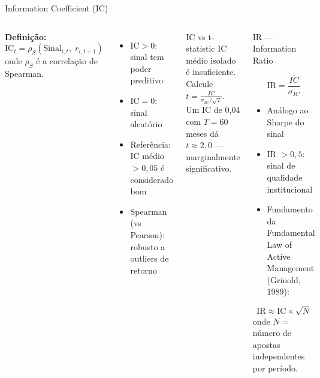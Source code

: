 \documentclass[aspectratio=169,12pt]{beamer}
\begin{document}
\begin{frame}[fragile]{Information Coefficient (IC)}
\begin{columns}[T]
\textbf{Definição:}
\[ \text{IC}_t = \rho_S\!\left(\text{Sinal}_{i,t},\; r_{i,t+1}\right) \]
onde $\rho_S$ é a correlação de Spearman.
\vspace{.4em}
\begin{itemize}
  \item $\text{IC} > 0$: sinal tem poder preditivo
  \item $\text{IC} = 0$: sinal aleatório
  \item Referência: IC médio $> 0{,}05$ é considerado bom
  \item Spearman (vs Pearson): robusto a outliers de retorno
\end{itemize}
\vspace{.3em}
\begin{alertblock}{IC vs t-statistic}
IC médio isolado é insuficiente. Calcule $t = \frac{\overline{IC}}{\sigma_{IC}/\sqrt{T}}$.
Um IC de 0{,}04 com $T=60$ meses dá $t \approx 2{,}0$ — marginalmente significativo.
\end{alertblock}
\begin{block}{IR — Information Ratio}

\[ \text{IR} = \frac{\overline{IC}}{\sigma_{IC}} \]
\begin{itemize}
  \item Análogo ao Sharpe do sinal
  \item IR $> 0{,}5$: sinal de qualidade institucional
  \item Fundamento da Fundamental Law of Active Management (Grinold, 1989):
\end{itemize}
\[ \text{IR} \approx \text{IC} \times \sqrt{N} \]
onde $N$ = número de apostas independentes por período.
\end{block}
\end{columns}
\end{frame}
\end{document}
